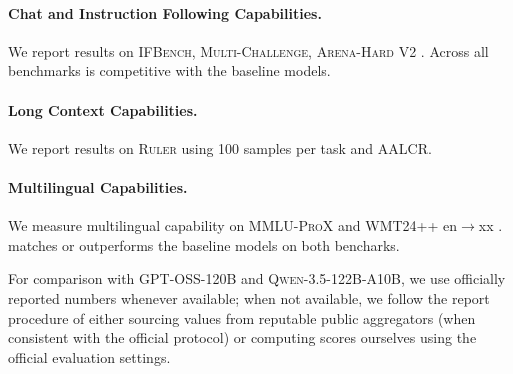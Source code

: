  


\paragraph{Chat and Instruction Following Capabilities.}
We report results on \textsc{IFBench}, \textsc{Multi-Challenge}, \textsc{Arena-Hard V2} \citep{li2024wildchat}. Across all benchmarks \ourmodel is competitive with the baseline models.

\paragraph{Long Context Capabilities.}
We report results on \textsc{Ruler} \citep{hsieh2024ruler} using 100 samples per task and \textsc{AALCR}. 

\paragraph{Multilingual Capabilities.}
We measure multilingual capability on 
\textsc{MMLU-ProX} \citep{xuan2025mmlu} and \textsc{WMT24++} en$\rightarrow$xx \citep{deutsch2025wmt24++}. \ourmodel matches or outperforms the baseline models on both bencharks.

For comparison with \textsc{GPT-OSS-120B} and \textsc{Qwen-3.5-122B-A10B}, we use officially reported numbers
whenever available; when not available, we follow the \nanomodel report \citep{nvidia2025nemotron3nanoopen} procedure of either sourcing values
from reputable public aggregators (when consistent with the official protocol) or computing scores
ourselves using the official evaluation settings.